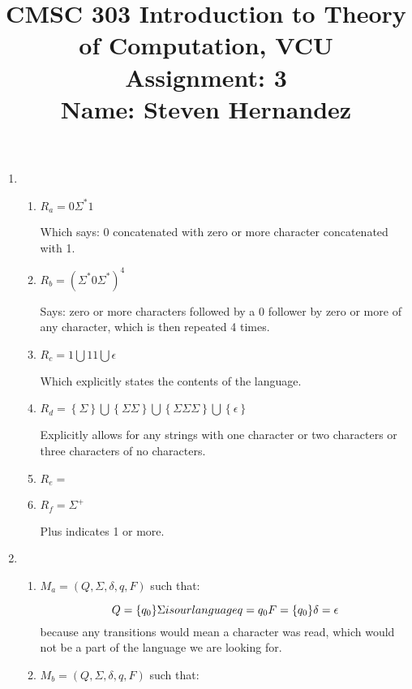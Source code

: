 \documentclass{article}
\newcommand{\set}[1]{{\left\{#1\right\}}}    %
\begin{document}
\title{
    CMSC 303 Introduction to Theory of Computation, VCU\\
    Assignment: 3\\
    Name: Steven Hernandez
}

\date{}

\maketitle
\vspace{-10mm}

\begin{enumerate}
    \item %
        \begin{enumerate}
            \item
                $R_a = 0\Sigma^*1$

                Which says: $0$ concatenated with zero or more character concatenated with 1.
            \item
                $R_b = (\Sigma^*0\Sigma^*)^4$

                Says: zero or more characters followed by a $0$ follower by zero or more of any character, which is then repeated 4 times.
            \item
                $R_c = 1 \bigcup 11 \bigcup \epsilon$

                Which explicitly states the contents of the language.
            \item
                $R_d = \set{\Sigma} \bigcup \set{\Sigma\Sigma} \bigcup \set{\Sigma\Sigma\Sigma} \bigcup \set{\epsilon}$

                Explicitly allows for any strings with one character or two characters or three characters of no characters.
            \item
                $R_e = $ %
            \item
                $R_f = \Sigma^+$

                Plus indicates 1 or more.
        \end{enumerate}
    \item %
        \begin{enumerate}
            \item
                $M_a = (Q, \Sigma, \delta, q, F)$ such that:

                \[  Q = \set{q_0} \\
                    \Sigma is our language \\
                    q = q_0 \\
                    F = \set{q_0} \\
                    \delta = \epsilon
                \]
                because any transitions would mean a character was read, which would not be a part of the language we are looking for.
            \item
                $M_b = (Q, \Sigma, \delta, q, F)$ such that:


\end{enumerate}
\end{enumerate}
\end{document}
